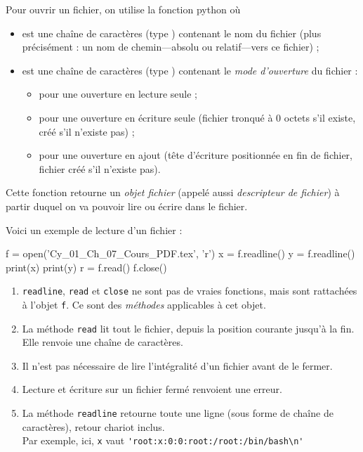 Pour ouvrir un fichier, on utilise la fonction python
 où
\begin{itemize}
  \item[\textbullet]  est une chaîne de caractères (type ) contenant le nom du fichier (plus précisément : un nom de chemin---absolu ou relatif---vers ce fichier) ;
  \item[\textbullet]  est une chaîne de caractères (type ) contenant le \emph{mode d'ouverture} du fichier :
    \begin{itemize}
      \item {} pour une ouverture en lecture seule ;
      \item {} pour une ouverture en écriture seule (fichier tronqué à 0 octets s'il existe, créé s'il n'existe pas) ;
      \item {} pour une ouverture en ajout (tête d'écriture positionnée en fin de fichier, fichier créé s'il n'existe pas).
\end{itemize}
\end{itemize}

Cette fonction retourne un \emph{objet fichier} (appelé aussi
\emph{descripteur de fichier}) à partir duquel on va
pouvoir lire ou écrire dans le fichier.


Voici un exemple de lecture d'un fichier :

\begin{pyconsole}
f = open('Cy_01_Ch_07_Cours_PDF.tex', 'r')
x = f.readline()
y = f.readline()
print(x) 
print(y)
r = f.read()
f.close()
\end{pyconsole}


\begin{rem}
  \begin{enumerate}
\item  \texttt{readline}, \texttt{read} et \texttt{close} ne sont pas de \og vraies fonctions\fg{}, mais sont rattachées à l'objet \texttt{f}. Ce sont des \emph{méthodes} applicables à cet objet.
\item La méthode \texttt{read} lit tout le fichier, depuis la position courante jusqu'à la fin. Elle renvoie une chaîne de caractères.
\item Il n'est pas nécessaire de lire l'intégralité d'un fichier avant de le fermer.
\item Lecture et écriture sur un fichier fermé renvoient une erreur.
\item La méthode \texttt{readline} retourne toute une ligne (sous forme de chaîne de caractères), retour chariot inclus.\\ Par exemple, ici, \texttt{x} vaut \verb+'root:x:0:0:root:/root:/bin/bash\n'+
\end{enumerate}
\end{rem}



